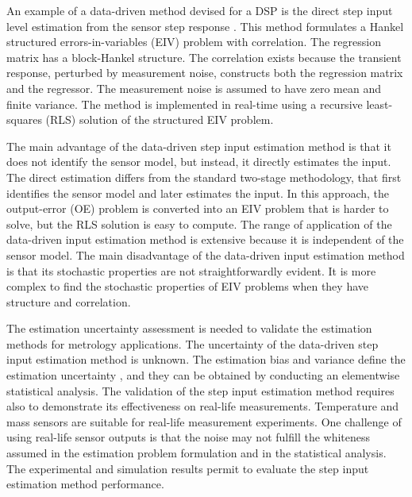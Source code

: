 An example of a data-driven method devised for a DSP is the direct step input level estimation from the sensor step response \citep{Markovsky15cep}.
This method formulates a Hankel structured errors-in-variables (EIV) problem with correlation.
The regression matrix has a block-Hankel structure.
The correlation exists because the transient response, perturbed by measurement noise, constructs both the regression matrix and the regressor.
The measurement noise is assumed to have zero mean and finite variance.
The method is implemented in real-time using a recursive least-squares (RLS) solution of the structured EIV problem.

The main advantage of the data-driven step input estimation method is that it does not identify the sensor model, but instead, it directly estimates the input. 
The direct estimation differs from the standard two-stage methodology, that first identifies the sensor model and later estimates the input.
In this approach, the output-error (OE) problem is converted into an EIV problem that is harder to solve, but the RLS solution is easy to compute.
The range of application of the data-driven input estimation method is extensive because it is independent of the sensor model.
The main disadvantage of the data-driven input estimation method is that its stochastic properties are not straightforwardly evident. 
It is more complex to find the stochastic properties of EIV problems when they have structure and correlation.


The estimation uncertainty assessment is needed to validate the estimation methods for metrology applications.
The uncertainty of the data-driven step input estimation method \citep{Markovsky15ieee} is unknown.
The estimation bias and variance define the estimation uncertainty \citep{Pintelon12Book}, and they can be obtained by conducting an elementwise statistical analysis. 
The validation of the step input estimation method requires also to demonstrate its effectiveness on real-life measurements.
Temperature and mass sensors are suitable for real-life measurement experiments.
One challenge of using real-life sensor outputs is that the noise may not fulfill the whiteness assumed in the estimation problem formulation and in the statistical analysis.
The experimental and simulation results permit to evaluate the step input estimation method performance.

